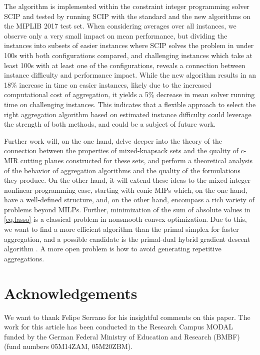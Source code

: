 \documentclass[a4paper,UKenglish,cleveref, autoref,  thm-restate]{lipics-v2021}
\begin{document}
	
	The algorithm is implemented within the constraint integer programming solver SCIP and tested by running SCIP with the standard and the new algorithms on the MIPLIB 2017 test set.
	When considering averages over all instances, we observe only a very small impact on mean performance, but dividing the instances into subsets of easier instances where SCIP solves the problem in under 100s with both configurations compared, and challenging instances which take at least 100s with at least one of the configurations, reveals a connection between instance difficulty and performance impact.
	While the new algorithm results in an 18\% increase in time on easier instances, likely due to the increased computational cost of aggregation, it yields a 5\% decrease in mean solver running time on challenging instances.
	This indicates that a flexible approach to select the right aggregation algorithm based on estimated instance difficulty could leverage the strength of both methods, and could be a subject of future work.
	
	
	Further work will, on the one hand, delve deeper into the theory of the connection between the properties of mixed-knapsack sets and the quality of c-MIR cutting planes constructed for these sets, and perform a theoretical analysis of the behavior of aggregation algorithms and the quality of the formulations they produce.
	On the other hand, it will extend these ideas to the mixed-integer nonlinear programming case, starting with conic MIPs which, on the one hand, have a well-defined structure, and, on the other hand, encompass a rich variety of problems beyond MILPs.  Further, minimization of the sum of absolute values in \eqref{eq.lasso} is a classical problem in nonsmooth convex  optimization. Due to this, we want to find a more efficient algorithm than the primal simplex for faster aggregation, and a possible candidate is the primal-dual hybrid gradient descent algorithm \cite{chambolle2011first}. A more open problem is how to avoid generating repetitive aggregations.
	
	{
		
	}{
		\section*{Acknowledgements}
		We want to thank Felipe Serrano for his insightful comments on this paper. The work for this article has been conducted in the Research Campus MODAL funded by the German Federal Ministry of Education and Research (BMBF) (fund numbers 05M14ZAM, 05M20ZBM).
	}
	
	
	
	
	
\end{document}
